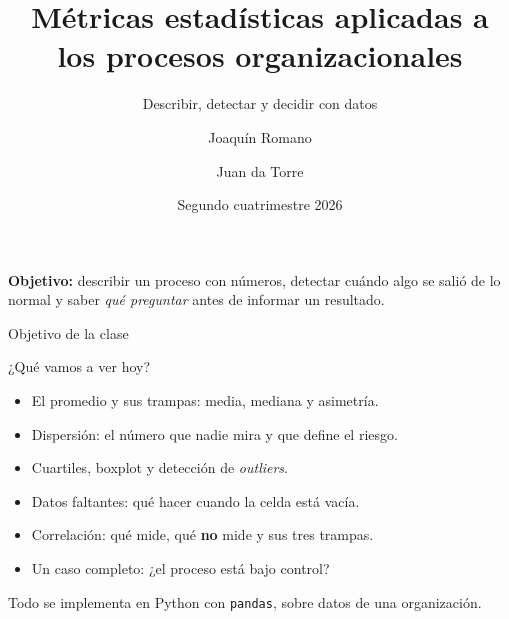 \documentclass[aspectratio=169,10pt]{beamer}
\title[Métricas estadísticas]{Métricas estadísticas aplicadas a los procesos organizacionales}
\subtitle{Describir, detectar y decidir con datos}
\author[Romano · da Torre]{Joaquín Romano \and Juan da Torre}
\institute[FCE-UBA]{Laboratorio de Métodos Cuantitativos Aplicados a la Gestión\\Universidad de Buenos Aires}
\date{Segundo cuatrimestre 2026}
\begin{document}
{
\begin{frame}[plain]
  \titlepage
  \vspace{-0.7em}
  \begin{center}
  \small\textbf{Objetivo:} describir un proceso con números, detectar cuándo algo se salió de lo normal
  y saber \emph{qué preguntar} antes de informar un resultado.
  \end{center}
\end{frame}}

\begin{frame}{Objetivo de la clase}
  \begin{block}{¿Qué vamos a ver hoy?}
    \begin{itemize}
      \item El promedio y sus trampas: media, mediana y asimetría.
      \item Dispersión: el número que nadie mira y que define el riesgo.
      \item Cuartiles, boxplot y detección de \emph{outliers}.
      \item Datos faltantes: qué hacer cuando la celda está vacía.
      \item Correlación: qué mide, qué \textbf{no} mide y sus tres trampas.
      \item Un caso completo: ¿el proceso está bajo control?
    \end{itemize}
  \end{block}
  \begin{center}
  \small Todo se implementa en Python con \texttt{pandas}, sobre datos de una organización.
  \end{center}
\end{frame}
\end{document}
